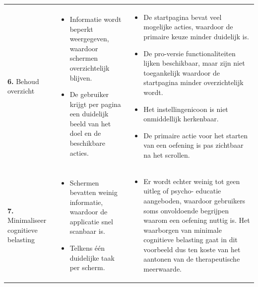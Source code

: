 {\begin{longtable}{
            >{\raggedright\arraybackslash}p{5.23cm}
            >{\raggedright\arraybackslash}p{4.93cm}
            >{\raggedright\arraybackslash}p{4.93cm}
        }
        \textbf{6.} Behoud overzicht
        & 
        \begin{itemize}[nosep,leftmargin=*,itemsep=10pt]
            \renewcommand{\labelitemi}{+}
            \item Informatie wordt beperkt weergegeven, waardoor schermen overzichtelijk blijven.
            \item De gebruiker krijgt per pagina een duidelijk beeld van het doel en de beschikbare acties.
        \end{itemize}
        & 
        \begin{itemize}[nosep,leftmargin=*,itemsep=10pt]
            \renewcommand{\labelitemi}{-}
            \item De startpagina bevat veel mogelijke acties, waardoor de primaire keuze minder duidelijk is.
            \item De pro-versie functionaliteiten lijken beschikbaar, maar zijn niet toegankelijk waardoor de startpagina minder overzichtelijk wordt.
            \item Het instellingenicoon is niet onmiddellijk herkenbaar.
            \item De primaire actie voor het starten van een oefening is pas zichtbaar na het scrollen.
        \end{itemize}
        \\
        
        \addlinespace[5pt]
        
        \textbf{7.} Minimaliseer cognitieve belasting
        & 
        \begin{itemize}[nosep,leftmargin=*,itemsep=10pt]
            \renewcommand{\labelitemi}{+}
            \item Schermen bevatten weinig informatie, waardoor de applicatie snel scanbaar is.
            \item Telkens één duidelijke taak per scherm.
        \end{itemize}
        & 
        \begin{itemize}[nosep,leftmargin=*,itemsep=10pt]
            \renewcommand{\labelitemi}{-}
            \item Er wordt echter weinig tot geen uitleg of psycho- educatie aangeboden, waardoor gebruikers soms onvoldoende begrijpen waarom een oefening nuttig is. Het waarborgen van minimale cognitieve belasting gaat in dit voorbeeld dus ten koste van het aantonen van de therapeutische meerwaarde.
        \end{itemize}
        \\
        

\end{longtable}}
